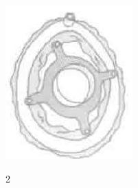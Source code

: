\documentclass[10pt]{article}
\begin{document}
\begin{center}
\includegraphics[max width=\textwidth]{2024_07_05_645bb794a4d4f32ee0c8g-283(1)}
\end{center}

2
\end{document}
